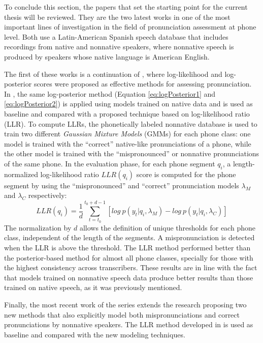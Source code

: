 To conclude this section, the papers that set the starting point for the current thesis will
be reviewed. They are the two latest works in one of the most important lines of investigation
in the field of pronunciation assessment at phone level.
Both use a Latin-American Spanish speech database that includes recordings from
native and nonnative speakers, where nonnative speech
is produced by speakers whose native language is American English.

The first of these works \cite{detection_phone_level_mispronunciation_learning} is
a continuation of \cite{pronunciation_scoring_phone_segments_instruction},
where log-likelihood and log-posterior scores were proposed as effective methods for
assessing pronunciation. In \cite{detection_phone_level_mispronunciation_learning},
the same log-posterior method (Equation \ref{eq:logPosterior1} and \ref{eq:logPosterior2})
is applied using models trained on native
data and is used as baseline and compared with a proposed technique
based on log-likelihood ratio (LLR).
To compute LLRs, the phonetically labeled nonnative
database is used to train two different \textit{Gaussian Mixture Models} (GMMs) for each phone
class: one model is trained with the ``correct'' native-like pronunciations of a phone, while the
other model is trained with the ``mispronounced'' or nonnative pronunciations of the same phone.
In the evaluation phase, for each phone segment $q_{i}$, a length-normalized log-likelihood ratio
$LLR(q_{i})$ score is computed for the phone segment by using the ``mispronounced'' and ``correct''
pronunciation models $\lambda_{M}$ and $\lambda_{C}$ respectively:
\begin{equation}
\label{eq:logLikelihoodRatio}
LLR(q_{i}) = \frac{1}{d}\sum_{t=t_{0}}^{t_{0}+d-1} [log \ p(y_{t}|q_{i}, \lambda_{M}) - log \ p(y_{t}|q_{i}, \lambda_{C})]
\end{equation}
The normalization by $d$ allows the definition of unique thresholds for each phone class,
independent of the length of the segments. A mispronunciation is detected when the LLR is above the threshold.
The LLR method performed better than the posterior-based method for almost all phone classes,
specially for those with the highest consistency across transcribers. These results are in
line with the fact that models trained on nonnative speech data
produce better results than
those trained on native speech, as it was previously mentioned.

Finally, the most recent work of the series \cite{main} extends the research
proposing two new methods that also explicitly model both mispronunciations and correct pronunciations
by nonnative speakers. The LLR method developed in
\cite{detection_phone_level_mispronunciation_learning} is used as baseline and compared with
the new modeling techniques.

